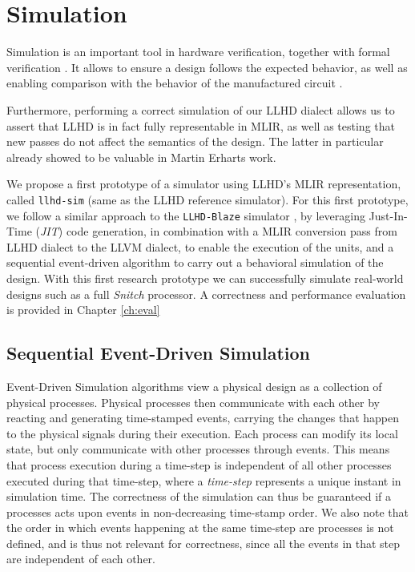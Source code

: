 
\chapter{Simulation}
\label{ch:sim}

Simulation is an important tool in hardware verification, together with formal verification \cite{YuanLu2001, Kumar1998}. It allows to ensure a design follows the expected behavior, as well as enabling comparison with the behavior of the manufactured circuit \cite{Ashenden1994}.

Furthermore, performing a correct simulation of our LLHD dialect allows us to assert that LLHD is in fact fully representable in MLIR, as well as testing that new passes do not affect the semantics of the design. The latter in particular already showed to be valuable in Martin Erharts work.

We propose a first prototype of a simulator using LLHD's MLIR representation, called \texttt{llhd-sim} (same as the LLHD reference simulator). For this first prototype, we follow a similar approach to the \texttt{LLHD-Blaze} simulator \cite{Schuiki2020}, by leveraging Just-In-Time (\textit{JIT}) code generation, in combination with a MLIR conversion pass from LLHD dialect to the LLVM dialect, to enable the execution of the units, and a sequential event-driven algorithm to carry out a behavioral simulation of the design. With this first research prototype we can successfully simulate real-world designs such as a full \textit{Snitch} \cite{Zaruba2020} processor. A correctness and performance evaluation is provided in Chapter \ref{ch:eval}


\section{Sequential Event-Driven Simulation}
Event-Driven Simulation algorithms \cite{Ashenden1994} view a physical design as a collection of physical processes. Physical processes then communicate with each other by reacting and generating time-stamped events, carrying the changes that happen to the physical signals during their execution. Each process can modify its local state, but only communicate with other processes through events. This means that process execution during a time-step is independent of all other processes executed during that time-step, where a \textit{time-step} represents a unique instant in simulation time. The correctness of the simulation can thus be guaranteed if a processes acts upon events in non-decreasing time-stamp order. We also note that the order in which events happening at the same time-step are processes is not defined, and is thus not relevant for correctness, since all the events in that step are independent of each other.


